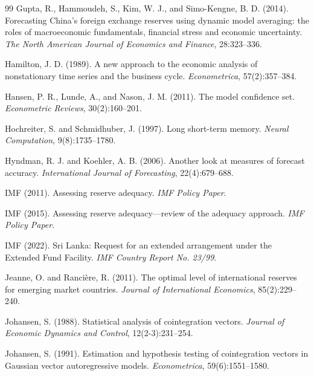 \documentclass[12pt,a4paper]{article}
\begin{document}
\begin{thebibliography}{99}
Gupta, R., Hammoudeh, S., Kim, W. J., and Simo-Kengne, B. D. (2014).
\newblock Forecasting China's foreign exchange reserves using dynamic model averaging: the roles of macroeconomic fundamentals, financial stress and economic uncertainty.
\newblock \textit{The North American Journal of Economics and Finance}, 28:323--336.

Hamilton, J. D. (1989).
\newblock A new approach to the economic analysis of nonstationary time series and the business cycle.
\newblock \textit{Econometrica}, 57(2):357--384.

Hansen, P. R., Lunde, A., and Nason, J. M. (2011).
\newblock The model confidence set.
\newblock \textit{Econometric Reviews}, 30(2):160--201.

Hochreiter, S. and Schmidhuber, J. (1997).
\newblock Long short-term memory.
\newblock \textit{Neural Computation}, 9(8):1735--1780.

Hyndman, R. J. and Koehler, A. B. (2006).
\newblock Another look at measures of forecast accuracy.
\newblock \textit{International Journal of Forecasting}, 22(4):679--688.

IMF (2011).
\newblock Assessing reserve adequacy.
\newblock \textit{IMF Policy Paper}.

IMF (2015).
\newblock Assessing reserve adequacy---review of the adequacy approach.
\newblock \textit{IMF Policy Paper}.

IMF (2022).
\newblock Sri Lanka: Request for an extended arrangement under the Extended Fund Facility.
\newblock \textit{IMF Country Report No. 23/99}.

Jeanne, O. and Ranci\`{e}re, R. (2011).
\newblock The optimal level of international reserves for emerging market countries.
\newblock \textit{Journal of International Economics}, 85(2):229--240.

Johansen, S. (1988).
\newblock Statistical analysis of cointegration vectors.
\newblock \textit{Journal of Economic Dynamics and Control}, 12(2-3):231--254.

Johansen, S. (1991).
\newblock Estimation and hypothesis testing of cointegration vectors in Gaussian vector autoregressive models.
\newblock \textit{Econometrica}, 59(6):1551--1580.


\end{thebibliography}
\end{document}
